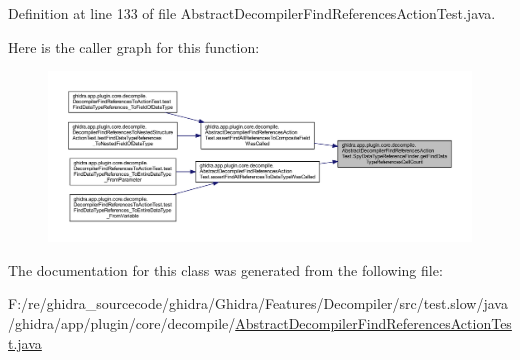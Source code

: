 Definition at line 133 of file Abstract\+Decompiler\+Find\+References\+Action\+Test.\+java.

Here is the caller graph for this function\+:
\nopagebreak
\begin{figure}[H]
\begin{center}
\leavevmode
\includegraphics[width=350pt]{classghidra_1_1app_1_1plugin_1_1core_1_1decompile_1_1_abstract_decompiler_find_references_action62f1da74789936d35e783df474af1e76_ad645a281a9626bf9c6db823800363505_icgraph}
\end{center}
\end{figure}


The documentation for this class was generated from the following file\+:\begin{DoxyCompactItemize}
\item 
F\+:/re/ghidra\+\_\+sourcecode/ghidra/\+Ghidra/\+Features/\+Decompiler/src/test.\+slow/java/ghidra/app/plugin/core/decompile/\mbox{\hyperlink{_abstract_decompiler_find_references_action_test_8java}{Abstract\+Decompiler\+Find\+References\+Action\+Test.\+java}}\end{DoxyCompactItemize}
